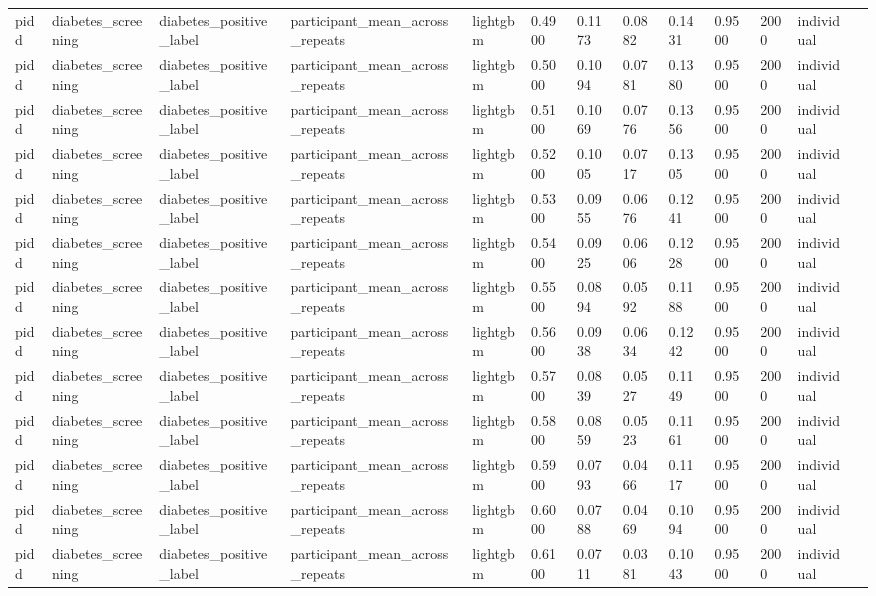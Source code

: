 \begin{tabular}{lllllllllllll}
pidd & diabetes\_screening & diabetes\_positive\_label & participant\_mean\_across\_repeats & lightgbm & 0.4900 & 0.1173 & 0.0882 & 0.1431 & 0.9500 & 2000 & individual &  \\
pidd & diabetes\_screening & diabetes\_positive\_label & participant\_mean\_across\_repeats & lightgbm & 0.5000 & 0.1094 & 0.0781 & 0.1380 & 0.9500 & 2000 & individual &  \\
pidd & diabetes\_screening & diabetes\_positive\_label & participant\_mean\_across\_repeats & lightgbm & 0.5100 & 0.1069 & 0.0776 & 0.1356 & 0.9500 & 2000 & individual &  \\
pidd & diabetes\_screening & diabetes\_positive\_label & participant\_mean\_across\_repeats & lightgbm & 0.5200 & 0.1005 & 0.0717 & 0.1305 & 0.9500 & 2000 & individual &  \\
pidd & diabetes\_screening & diabetes\_positive\_label & participant\_mean\_across\_repeats & lightgbm & 0.5300 & 0.0955 & 0.0676 & 0.1241 & 0.9500 & 2000 & individual &  \\
pidd & diabetes\_screening & diabetes\_positive\_label & participant\_mean\_across\_repeats & lightgbm & 0.5400 & 0.0925 & 0.0606 & 0.1228 & 0.9500 & 2000 & individual &  \\
pidd & diabetes\_screening & diabetes\_positive\_label & participant\_mean\_across\_repeats & lightgbm & 0.5500 & 0.0894 & 0.0592 & 0.1188 & 0.9500 & 2000 & individual &  \\
pidd & diabetes\_screening & diabetes\_positive\_label & participant\_mean\_across\_repeats & lightgbm & 0.5600 & 0.0938 & 0.0634 & 0.1242 & 0.9500 & 2000 & individual &  \\
pidd & diabetes\_screening & diabetes\_positive\_label & participant\_mean\_across\_repeats & lightgbm & 0.5700 & 0.0839 & 0.0527 & 0.1149 & 0.9500 & 2000 & individual &  \\
pidd & diabetes\_screening & diabetes\_positive\_label & participant\_mean\_across\_repeats & lightgbm & 0.5800 & 0.0859 & 0.0523 & 0.1161 & 0.9500 & 2000 & individual &  \\
pidd & diabetes\_screening & diabetes\_positive\_label & participant\_mean\_across\_repeats & lightgbm & 0.5900 & 0.0793 & 0.0466 & 0.1117 & 0.9500 & 2000 & individual &  \\
pidd & diabetes\_screening & diabetes\_positive\_label & participant\_mean\_across\_repeats & lightgbm & 0.6000 & 0.0788 & 0.0469 & 0.1094 & 0.9500 & 2000 & individual &  \\
pidd & diabetes\_screening & diabetes\_positive\_label & participant\_mean\_across\_repeats & lightgbm & 0.6100 & 0.0711 & 0.0381 & 0.1043 & 0.9500 & 2000 & individual &  \\

\end{tabular}
